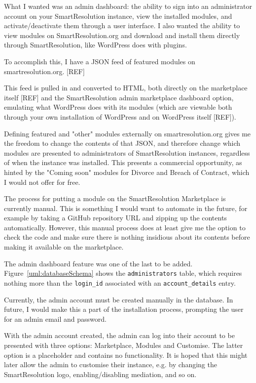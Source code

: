 What I wanted was an admin dashboard: the ability to sign into an administrator account on your SmartResolution instance, view the installed modules, and activate/deactivate them through a user interface. I also wanted the ability to view modules on SmartResolution.org and download and install them directly through SmartResolution, like WordPress does with plugins.

To accomplish this, I have a JSON feed of featured modules on smartresolution.org. [REF] %

This feed is pulled in and converted to HTML, both directly on the marketplace itself [REF] and the SmartResolution admin marketplace dashboard option, emulating what WordPress does with its modules (which are viewable both through your own installation of WordPress and on WordPress itself [REF]). %

Defining featured and "other" modules externally on smartresolution.org gives me the freedom to change the contents of that JSON, and therefore change which modules are presented to administrators of SmartResolution instances, regardless of when the instance was installed. This presents a commercial opportunity, as hinted by the "Coming soon" modules for Divorce and Breach of Contract, which I would not offer for free.

The process for putting a module on the SmartResolution Marketplace is currently manual. This is something I would want to automate in the future, for example by taking a GitHub repository URL and zipping up the contents automatically. However, this manual process does at least give me the option to check the code and make sure there is nothing insidious about its contents before making it available on the marketplace.

The admin dashboard feature was one of the last to be added. Figure~\ref{uml:databaseSchema} shows the \lstinline{administrators} table, which requires nothing more than the \lstinline{login_id} associated with an \lstinline{account_details} entry.

Currently, the admin account must be created manually in the database. In future, I would make this a part of the installation process, prompting the user for an admin email and password.

With the admin account created, the admin can log into their account to be presented with three options: Marketplace, Modules and Customise. The latter option is a placeholder and contains no functionality. It is hoped that this might later allow the admin to customise their instance, e.g. by changing the SmartResolution logo, enabling/disabling mediation, and so on.

